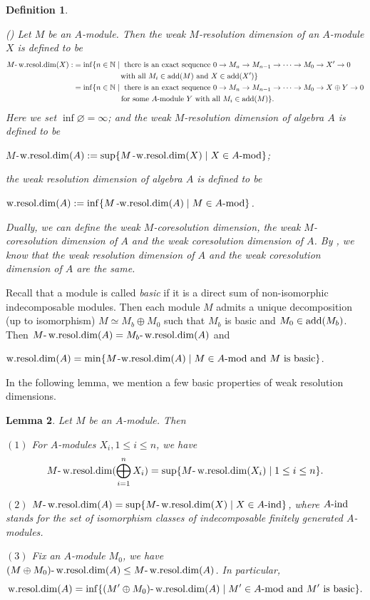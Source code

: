 \documentclass[12pt]{article}
\numberwithin{equation}{section}
\newtheorem{Def}{Definition}[section]
\newtheorem{Lem}[Def]{Lemma}
\theoremstyle{definition}
\newcommand{\add}{{\rm add}}
\def\wrd{\mathop{\rm w.resol.dim}\nolimits}
\newcommand{\modcat}{\ensuremath{\mbox{{\rm -mod}}}}
\newcommand{\indmod}{\ensuremath{\mbox{{\rm -ind}}}}
\newcommand{\ra}{\rightarrow}
\begin{document}
\begin{Def}\label{wrd-def}{\rm (\cite[Defition 4.5(2)]{Iyama2003})
Let $M$ be an $A$-module. Then the \emph{weak $M$-resolution dimension} of an $A$-module $X$ is defined to be
\begin{align*}
M\mbox{-}\wrd(X):&=\inf \{n\in\mathbb{N} \mid \mbox{ there is an exact sequence } 0 \ra M_{n} \ra M_{n-1}\ra\cdots \ra M_{0}\ra X'\ra 0 \\
&\qquad\qquad\qquad\;\mbox{with all } M_{i}\in \add(M) \mbox{ and }X\in\add(X')\}
\\
&=\inf \{n\in\mathbb{N} \mid \mbox{ there is an exact sequence } 0 \ra M_{n} \ra M_{n-1}\ra\cdots \ra M_{0}\ra X\oplus Y\ra 0 \\
&\qquad\qquad\qquad\mbox{ for some }A\mbox{-module } Y\mbox{ with all } M_{i}\in \add(M)\}.
\end{align*}
Here we set $\inf\varnothing=\infty$; and the \emph{weak $M$-resolution dimension} of algebra $A$ is defined to be
\begin{center}
$M$-$\wrd(A):=\sup\{M$-$\wrd(X) \mid X\in A\modcat\}$;
 \end{center}
the \emph{weak resolution dimension} of algebra $A$ is defined to be
\begin{center}
$\wrd(A):=\inf\{M$-$\wrd(A)\mid M\in A\modcat\}$.
\end{center}

Dually, we can define the \emph{weak $M$-coresolution dimension}, the \emph{weak $M$-coresolution dimension} of $A$ and the \emph{weak coresolution dimension} of $A$. By \cite[Definition 4.5]{Iyama2003}, we know that the weak resolution dimension of $A$ and the weak coresolution dimension of $A$ are the same.
}\end{Def}
Recall that a module is called \emph{basic} if it is a direct sum of non-isomorphic indecomposable modules. Then each module $M$ admits a unique decomposition (up to isomorphism) $M\simeq M_b\oplus M_0$ such that $M_b$ is basic and $M_0\in\add(M_b)$. Then $M\mbox{-}\wrd(A)=M_b\mbox{-}\wrd(A)$ and
\begin{center}
$\wrd(A)=\min\{M$-$\wrd(A)\mid M\in A\modcat \mbox{ and } M \mbox{ is basic} \}$.
\end{center}

In the following lemma, we mention a few basic properties of weak resolution dimensions.
\begin{Lem}\label{weak-prop}
Let $M$ be an $A$-module. Then

$(1)$ For $A$-modules $X_i,1\le i\le n$, we have $$M\mbox{-}\wrd(\bigoplus\limits_{i=1}^nX_i)
=\sup\{M\mbox{-}\wrd(X_i)\mid 1\le i\le n\}.$$

$(2)$ $M\mbox{-}\wrd(A)=\sup\{M\mbox{-}\wrd(X)\mid X\in A\indmod\}$,
where $A\indmod$ stands for the set of isomorphism classes of indecomposable finitely generated $A$-modules.

$(3)$ Fix an $A$-module $M_0$, we have $(M\oplus M_0)\mbox{-}\wrd(A)\le M\mbox{-}\wrd(A)$. In particular, $$\wrd(A)=\inf\{(M'\oplus M_0)\mbox{-}\wrd(A)\mid M'\in A\modcat \mbox{ and } M' \mbox{ is basic}\}.$$
\end{Lem}
\end{document}
